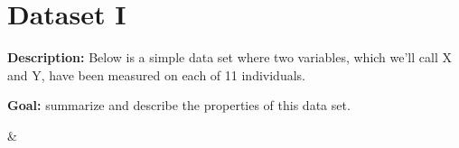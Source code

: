 \documentclass[12pt]{article}
\begin{document}
\section*{Dataset I}

\textbf{Description:} Below is a simple  data set where two variables, which we'll call X and Y, have been measured on each of 11 individuals.

\textbf{Goal:} summarize and describe the properties of this data set. 

\begin{center}
%
{\csvcoli & \csvcolii}
\end{center}
\end{document}

